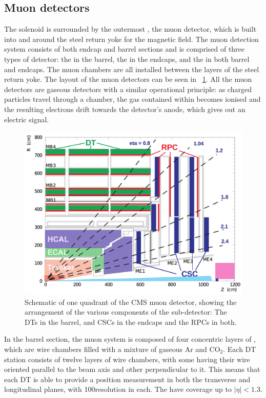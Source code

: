 \subsection{Muon detectors}
\label{sec:cms:muondetector}

The solenoid is surrounded by the outermost \subdetector, the muon detector, which is built into and around the steel return yoke for the magnetic field.
The \CMS muon detection system consists of both endcap and barrel sections and is comprised of three types of detector: the \DTs in the barrel, the \CSCs in the endcaps, and the \RPCs in both barrel and endcaps. The muon chambers are all installed between the layers of the steel return yoke. The layout of the muon detectors can be seen in \Fig~\ref{fig:muonssystem}. All the muon detectors are gaseous detectors with a similar operational principle: as charged particles travel through a chamber, the gas contained within becomes ionised and the resulting electrons drift towards the detector's anode, which gives out an electric signal. 
\begin{figure}[h]
\centering
\includegraphics[width=1.0\textwidth]{detectorFigures/cmsMuonSystem.png}
\caption{Schematic \crosssection of one quadrant of the CMS muon detector, showing the arrangement of the various components of the sub-detector: The DTs in the barrel, and CSCs in the endcaps and the RPCs in both\quad\cite{MuonReco}.}
\label{fig:muonssystem}
\end{figure}

 In the barrel section, the muon system is composed of four concentric layers of \DTs, which are wire chambers filled with a mixture of gaseous Ar and CO$_{2}$. Each DT station consists of twelve layers of wire chambers, with some having their wire oriented parallel to the beam axis and other perpendicular to it. This means that each DT is able to provide a position measurement in both the transverse and longitudinal planes, with 100\um resolution in each. The \DTs have coverage up to $|\eta|<1.3$. 

